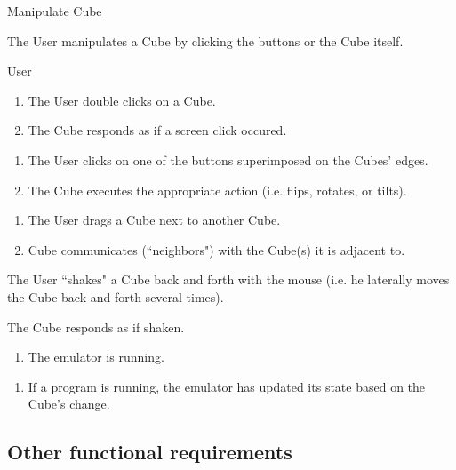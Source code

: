 \documentclass[12pt]{article}
\begin{document}
    \begin{description}
      \item[Name:] Manipulate Cube
      \item[Description:] The User manipulates a Cube by clicking the buttons or the Cube itself.
      \item[Actors:] User
      \item[Basic flow:] \hfill
        \begin{enumerate}
	  \item{The User double clicks on a Cube.}
	  \item{The Cube responds as if a screen click occured.}
        \end{enumerate}
      \item[Alternate flows:] \hfill
        \begin{enumerate}
	  \item{The User clicks on one of the buttons superimposed on the Cubes' edges.}
	  \item{The Cube executes the appropriate action (i.e. flips, rotates, or tilts).}
        \end{enumerate}
        \begin{enumerate}
          \item{The User drags a Cube next to another Cube.}
	  \item{Cube communicates (``neighbors") with the Cube(s) it is adjacent to.}
        \end{enumerate}
	  \item{The User ``shakes" a Cube back and forth with the mouse (i.e. he laterally moves the Cube back and forth several times).}
	  \item{The Cube responds as if shaken.}
      \item[Pre-conditions:] \hfill
        \begin{enumerate}
          \item{The emulator is running.}
        \end{enumerate}
      \item[Post-conditions:] \hfill
        \begin{enumerate}
	  \item{If a program is running, the emulator has updated its state based on the Cube's change.}
        \end{enumerate}
    \end{description}
	
  \subsection{Other functional requirements}
\end{document}
